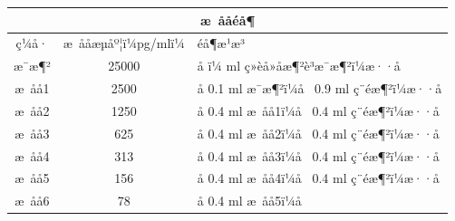 \documentclass[UTF8,10pt,a4paper,fontset=fandol]{ctexart}
\newcommand{\fieldvalue}[1]{#1}
\newcommand{\handwritten}[1]{#1}
\begin{document}
\begin{tabularx}{\textwidth}{|c|c|X|}
\hline
\multicolumn{3}{|c|}{æ ååéå¶}\\ \hline
ç¼å· & æ ååæµåº¦ï¼pg/mlï¼ & éå¶æ¹æ³ \\ \hline
æ¯æ¶² & 25000 &
å
\fieldvalue{\handwritten{ï¼}}
ml ç»èå»å­æ¶²è³æ¯æ¶²ï¼æ··å
\\ \hline
æ åå1 & 2500 &
å
\fieldvalue{\handwritten{0.1}}
ml æ¯æ¶²ï¼å 
\fieldvalue{\handwritten{0.9}}
ml ç¨éæ¶²ï¼æ··å
\\ \hline
æ åå2 & 1250 &
å
\fieldvalue{\handwritten{0.4}}
ml æ åå1ï¼å 
\fieldvalue{\handwritten{0.4}}
ml ç¨éæ¶²ï¼æ··å
\\ \hline
æ åå3 & 625 &
å
\fieldvalue{\handwritten{0.4}}
ml æ åå2ï¼å 
\fieldvalue{\handwritten{0.4}}
ml ç¨éæ¶²ï¼æ··å
\\ \hline
æ åå4 & 313 &
å
\fieldvalue{\handwritten{0.4}}
ml æ åå3ï¼å 
\fieldvalue{\handwritten{0.4}}
ml ç¨éæ¶²ï¼æ··å
\\ \hline
æ åå5 & 156 &
å
\fieldvalue{\handwritten{0.4}}
ml æ åå4ï¼å 
\fieldvalue{\handwritten{0.4}}
ml ç¨éæ¶²ï¼æ··å
\\ \hline
æ åå6 & 78 &
å
\fieldvalue{\handwritten{0.4}}
ml æ åå5ï¼å 

\end{tabularx}
\end{document}
